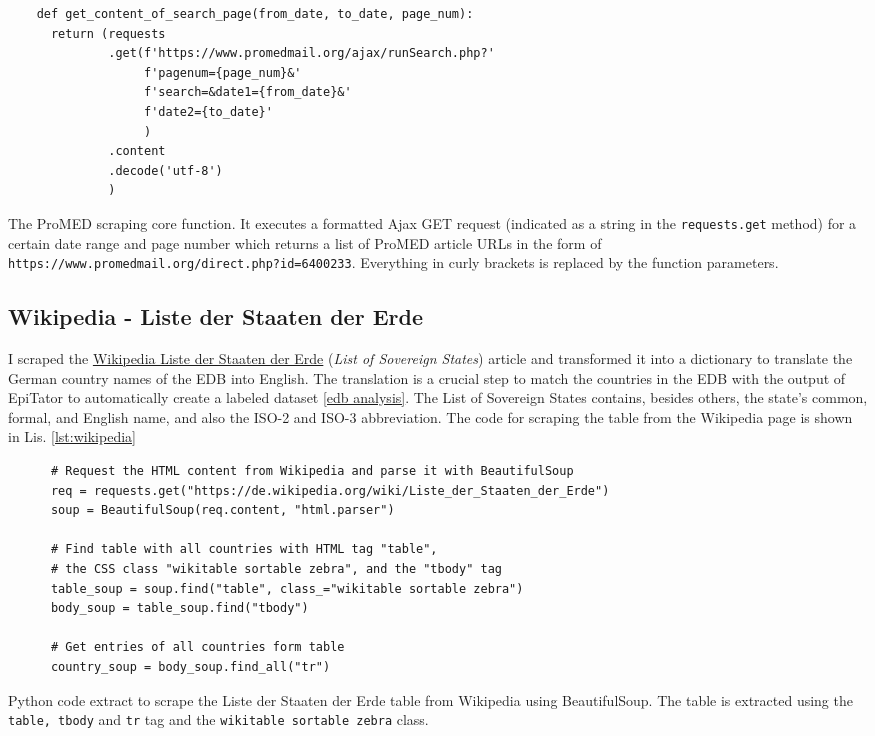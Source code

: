   \begin{listing}[h!]
    \begin{verbatim}
    def get_content_of_search_page(from_date, to_date, page_num):
      return (requests
              .get(f'https://www.promedmail.org/ajax/runSearch.php?'
                   f'pagenum={page_num}&'
                   f'search=&date1={from_date}&'
                   f'date2={to_date}'
                   )
              .content
              .decode('utf-8')
              )
    \end{verbatim}
    \caption{The ProMED scraping core function. It executes a formatted Ajax GET request (indicated as a string in the \texttt{requests.get} method) for a certain date range and page number which returns a list of ProMED article URLs in the form of \textquotesingle \texttt{https://www.promedmail.org/direct.php?id=6400233}\textquotesingle. Everything in curly brackets is replaced by the function parameters.}
    \label{lst:promed}
  \end{listing}

\subsection{Wikipedia - Liste der Staaten der Erde}\label{wikipedia}
  I scraped the \href{https://de.wikipedia.org/wiki/Liste_der_Staaten_der_Erde}{Wikipedia Liste der Staaten der Erde} (\textit{List of Sovereign States}) article and transformed it into a dictionary to translate the German country names of the EDB into English.
  The translation is a crucial step to match the countries in the EDB with the output of EpiTator to automatically create a labeled dataset \ref{edb analysis}.
  The List of Sovereign States contains, besides others, the state's common, formal, and English name, and also the ISO-2 and ISO-3 abbreviation.
  The code for scraping the table from the Wikipedia page is shown in Lis. \ref{lst:wikipedia}

  \begin{listing}[h]
    \begin{verbatim}
      # Request the HTML content from Wikipedia and parse it with BeautifulSoup
      req = requests.get("https://de.wikipedia.org/wiki/Liste_der_Staaten_der_Erde")
      soup = BeautifulSoup(req.content, "html.parser")

      # Find table with all countries with HTML tag "table",
      # the CSS class "wikitable sortable zebra", and the "tbody" tag
      table_soup = soup.find("table", class_="wikitable sortable zebra")
      body_soup = table_soup.find("tbody")

      # Get entries of all countries form table
      country_soup = body_soup.find_all("tr")
    \end{verbatim}
    \caption{Python code extract to scrape the Liste der Staaten der Erde table from Wikipedia using BeautifulSoup. The table is extracted using the \texttt{table, tbody} and \texttt{tr} tag and the \texttt{wikitable sortable zebra} class.}
    \label{lst:wikipedia}
  \end{listing}


